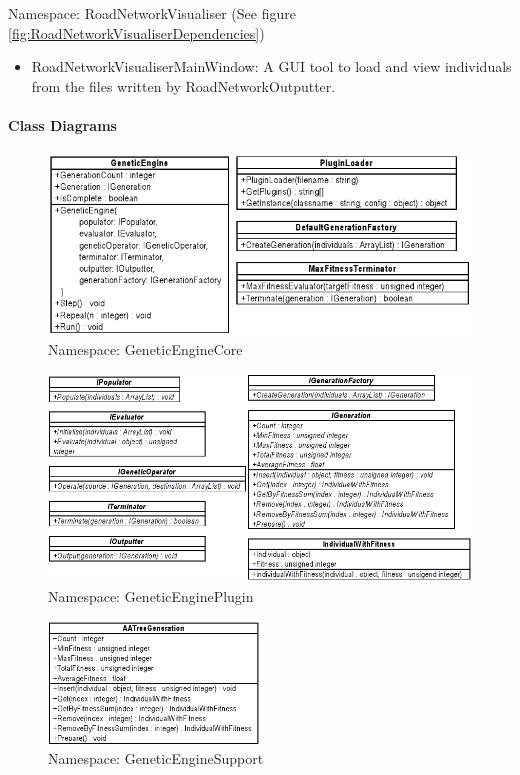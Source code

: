 Namespace: RoadNetworkVisualiser (See figure \ref{fig:RoadNetworkVisualiserDependencies})
\begin{itemize}
\item RoadNetworkVisualiserMainWindow: A GUI tool to load and view individuals from the files written by RoadNetworkOutputter.
\end{itemize}

\paragraph{Class Diagrams}

\begin{figure}[ht!]
 \caption{Namespace: GeneticEngineCore}\label{fig:GeneticEngineCore}
 \centering
 \includegraphics[width=\textwidth]{../GeneticEngineCoreDetail.png}
\end{figure}

\begin{figure}[ht!]
 \caption{Namespace: GeneticEnginePlugin}\label{fig:GeneticEnginePlugin}
 \centering
 \includegraphics[width=\textwidth]{../GeneticEnginePluginDetail.png}
\end{figure}

\begin{figure}[ht!]
 \caption{Namespace: GeneticEngineSupport}\label{fig:GeneticEngineSupport}
 \centering
 \includegraphics[width=0.5\textwidth]{../GeneticEngineSupportDetail.png}
\end{figure}

